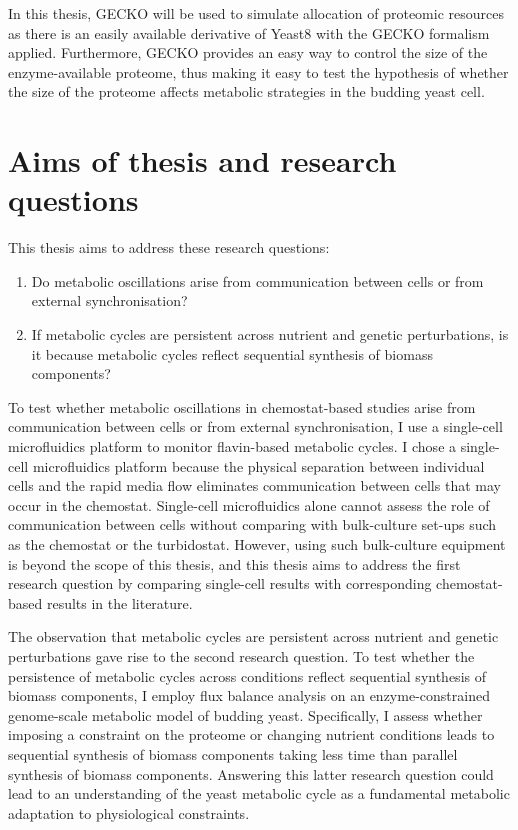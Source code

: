 In this thesis, GECKO will be used to simulate allocation of proteomic resources as there is an easily available derivative of Yeast8 with the GECKO formalism applied.
Furthermore, GECKO provides an easy way to control the size of the enzyme-available proteome, thus making it easy to test the hypothesis of whether the size of the proteome affects metabolic strategies in the budding yeast cell.


\section{Aims of thesis and research questions}
\label{sec:intro-aims}

This thesis aims to address these research questions:
\begin{enumerate}
  \item Do metabolic oscillations arise from communication between cells or from external synchronisation?
  \item If metabolic cycles are persistent across nutrient and genetic perturbations, is it because metabolic cycles reflect sequential synthesis of biomass components?
\end{enumerate}

To test whether metabolic oscillations in chemostat-based studies arise from communication between cells or from external synchronisation, I use a single-cell microfluidics platform to monitor flavin-based metabolic cycles.
I chose a single-cell microfluidics platform because the physical separation between individual cells and the rapid media flow eliminates communication between cells that may occur in the chemostat.
Single-cell microfluidics alone cannot assess the role of communication between cells without comparing with bulk-culture set-ups such as the chemostat or the turbidostat.
However, using such bulk-culture equipment is beyond the scope of this thesis, and this thesis aims to address the first research question by comparing single-cell results with corresponding chemostat-based results in the literature.

The observation that metabolic cycles are persistent across nutrient and genetic perturbations gave rise to the second research question.
To test whether the persistence of metabolic cycles across conditions reflect sequential synthesis of biomass components, I employ flux balance analysis on an enzyme-constrained genome-scale metabolic model of budding yeast.
Specifically, I assess whether imposing a constraint on the proteome or changing nutrient conditions leads to sequential synthesis of biomass components taking less time than parallel synthesis of biomass components.
Answering this latter research question could lead to an understanding of the yeast metabolic cycle as a fundamental metabolic adaptation to physiological constraints.

